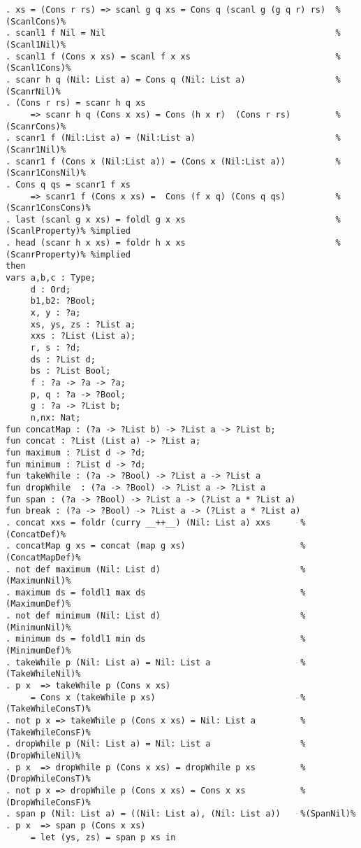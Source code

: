 \begin{Verbatim}
. xs = (Cons r rs) => scanl g q xs = Cons q (scanl g (g q r) rs)  %(ScanlCons)%
. scanl1 f Nil = Nil                                              %(Scanl1Nil)%
. scanl1 f (Cons x xs) = scanl f x xs                             %(Scanl1Cons)%
. scanr h q (Nil: List a) = Cons q (Nil: List a)                  %(ScanrNil)%
. (Cons r rs) = scanr h q xs
     => scanr h q (Cons x xs) = Cons (h x r)  (Cons r rs)         %(ScanrCons)%
. scanr1 f (Nil:List a) = (Nil:List a)                            %(Scanr1Nil)%
. scanr1 f (Cons x (Nil:List a)) = (Cons x (Nil:List a))          %(Scanr1ConsNil)%
. Cons q qs = scanr1 f xs  
     => scanr1 f (Cons x xs) =  Cons (f x q) (Cons q qs)          %(Scanr1ConsCons)%
. last (scanl g x xs) = foldl g x xs                              %(ScanlProperty)% %implied
. head (scanr h x xs) = foldr h x xs                              %(ScanrProperty)% %implied
then
vars a,b,c : Type;
     d : Ord;
     b1,b2: ?Bool;
     x, y : ?a;
     xs, ys, zs : ?List a;
     xxs : ?List (List a);
     r, s : ?d;
     ds : ?List d;
     bs : ?List Bool;
     f : ?a -> ?a -> ?a;
     p, q : ?a -> ?Bool;
     g : ?a -> ?List b;
     n,nx: Nat;
fun concatMap : (?a -> ?List b) -> ?List a -> ?List b;
fun concat : ?List (List a) -> ?List a;
fun maximum : ?List d -> ?d;
fun minimum : ?List d -> ?d;
fun takeWhile : (?a -> ?Bool) -> ?List a -> ?List a
fun dropWhile  : (?a -> ?Bool) -> ?List a -> ?List a
fun span : (?a -> ?Bool) -> ?List a -> (?List a * ?List a)
fun break : (?a -> ?Bool) -> ?List a -> (?List a * ?List a)
. concat xxs = foldr (curry __++__) (Nil: List a) xxs      %(ConcatDef)%
. concatMap g xs = concat (map g xs)                       %(ConcatMapDef)%
. not def maximum (Nil: List d)                            %(MaximunNil)%
. maximum ds = foldl1 max ds                               %(MaximumDef)%
. not def minimum (Nil: List d)                            %(MinimunNil)%
. minimum ds = foldl1 min ds                               %(MinimumDef)%
. takeWhile p (Nil: List a) = Nil: List a                  %(TakeWhileNil)%
. p x  => takeWhile p (Cons x xs) 
     = Cons x (takeWhile p xs)                             %(TakeWhileConsT)%
. not p x => takeWhile p (Cons x xs) = Nil: List a         %(TakeWhileConsF)%
. dropWhile p (Nil: List a) = Nil: List a                  %(DropWhileNil)%
. p x  => dropWhile p (Cons x xs) = dropWhile p xs         %(DropWhileConsT)%
. not p x => dropWhile p (Cons x xs) = Cons x xs           %(DropWhileConsF)%
. span p (Nil: List a) = ((Nil: List a), (Nil: List a))    %(SpanNil)%
. p x  => span p (Cons x xs) 
     = let (ys, zs) = span p xs in

\end{Verbatim}
